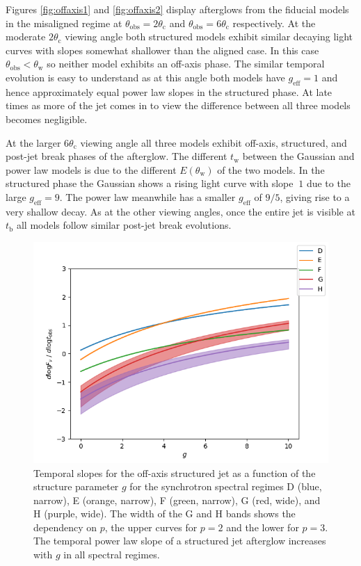 \documentclass[twocolumn]{aastex62}
\newcommand{\tW}{\ensuremath{t_{\mathrm{w}}}}
\newcommand{\tb}{\ensuremath{t_{\mathrm{b}}}}
\newcommand{\thobs}{\ensuremath{\theta_{\mathrm{obs}}}}
\newcommand{\thW}{\ensuremath{\theta_{\mathrm{w}}}}
\newcommand{\thC}{\ensuremath{\theta_{\mathrm{c}}}}
\newcommand{\geff}{\ensuremath{g_{\mathrm{eff}}}}
\begin{document}
Figures \ref{fig:offaxis1} and \ref{fig:offaxis2} display afterglows from the fiducial models in the misaligned regime at $\thobs = 2\thC$ and $\thobs=6\thC$ respectively.  At the moderate $2\thC$ viewing angle both structured models exhibit similar decaying light curves with slopes somewhat shallower than the aligned case. In this case $\thobs < \thW$ so neither model exhibits an off-axis phase.  The similar temporal evolution is easy to understand as at this angle both models have $\geff = 1$ and hence approximately equal power law slopes in the structured phase.  At late times as more of the jet comes in to view the difference between all three models becomes negligible. 

At the larger $6\thC$ viewing angle all three models exhibit off-axis, structured, and post-jet break phases of the afterglow.  The different $\tW$ between the Gaussian and power law models is due to the different $E(\thW)$ of the two models. In the structured phase the Gaussian shows a rising light curve with slope $~1$ due to the large $\geff = 9$.  The power law meanwhile has a smaller $\geff$ of $9/5$, giving rise to a very shallow decay. As at the other viewing angles, once the entire jet is visible at $\tb$ all models follow similar post-jet break evolutions.

%
%

\begin{figure}
	\includegraphics[width=\columnwidth]{figs/slopesJet.png}
	\caption{Temporal slopes for the off-axis structured jet as a function of the structure parameter $g$ for the synchrotron spectral regimes D (blue, narrow), E (orange, narrow),  F (green, narrow), G (red, wide), and H (purple, wide).  The width of the G and H bands shows the dependency on $p$, the upper curves for $p=2$ and the lower for $p=3$.  The temporal power law slope of a structured jet afterglow increases with $g$ in all spectral regimes. \label{fig:slopesG}}
\end{figure}
\end{document}
